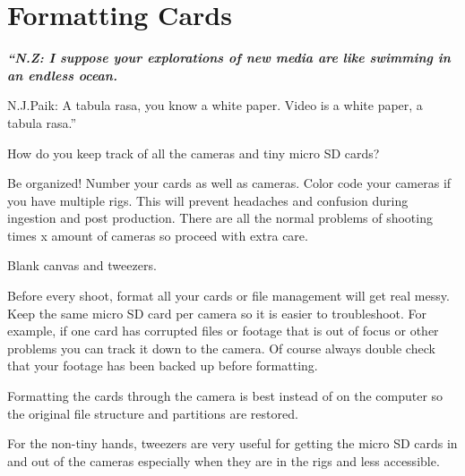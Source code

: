\chapter{Formatting Cards}
\pagecolor{white}
\label{chap:4}
\begin{fullwidth}


{\itshape\bfseries “N.Z: I suppose your explorations of new media are like swimming in an endless ocean. 

N.J.Paik: A tabula rasa, you know a white paper. Video is a white paper, a tabula rasa.”}

\vspace{\baselineskip}

\problem

{\large How do you keep track of all the cameras and tiny micro SD cards? \par}

Be organized! Number your cards as well as cameras. Color code your cameras if you have multiple rigs. This will prevent headaches and confusion during ingestion and post production. There are all the normal problems of shooting times x amount of cameras so proceed with extra care. 


\solution

{\large Blank canvas and tweezers.
 \par}

Before every shoot, format all your cards or file management will get real messy. Keep the same micro SD card per camera so it is easier to troubleshoot. For example, if one card has corrupted files or footage that is out of focus or other problems you can track it down to the camera. Of course always double check that your footage has been backed up before formatting. 

Formatting the cards through the camera is best instead of on the computer so the original file structure and partitions are restored. 

\tip For the non-tiny hands, tweezers are very useful for getting the micro SD cards in and out of the cameras especially when they are in the rigs and less accessible. 



\clearpage
\end{fullwidth}
